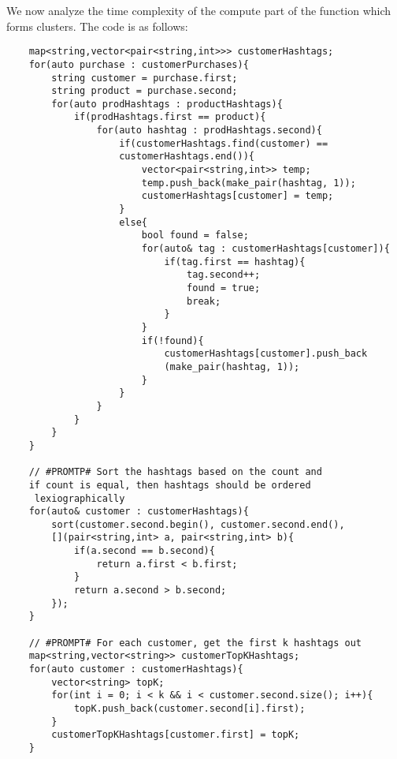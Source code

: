 \documentclass[12pt]{article}
\begin{document}
We now analyze the time complexity of the compute part of the function which forms clusters. The code is as follows:
\begin{verbatim}
    map<string,vector<pair<string,int>>> customerHashtags;
    for(auto purchase : customerPurchases){
        string customer = purchase.first;
        string product = purchase.second;
        for(auto prodHashtags : productHashtags){
            if(prodHashtags.first == product){
                for(auto hashtag : prodHashtags.second){
                    if(customerHashtags.find(customer) == 
                    customerHashtags.end()){
                        vector<pair<string,int>> temp;
                        temp.push_back(make_pair(hashtag, 1));
                        customerHashtags[customer] = temp;
                    }
                    else{
                        bool found = false;
                        for(auto& tag : customerHashtags[customer]){
                            if(tag.first == hashtag){
                                tag.second++;
                                found = true;
                                break;
                            }
                        }
                        if(!found){
                            customerHashtags[customer].push_back
                            (make_pair(hashtag, 1));
                        }
                    }
                }
            }
        }
    }

    // #PROMTP# Sort the hashtags based on the count and 
    if count is equal, then hashtags should be ordered
     lexiographically
    for(auto& customer : customerHashtags){
        sort(customer.second.begin(), customer.second.end(), 
        [](pair<string,int> a, pair<string,int> b){
            if(a.second == b.second){
                return a.first < b.first;
            }
            return a.second > b.second;
        });
    }

    // #PROMPT# For each customer, get the first k hashtags out
    map<string,vector<string>> customerTopKHashtags;
    for(auto customer : customerHashtags){
        vector<string> topK;
        for(int i = 0; i < k && i < customer.second.size(); i++){
            topK.push_back(customer.second[i].first);
        }
        customerTopKHashtags[customer.first] = topK;
    }


\end{verbatim}
\end{document}
